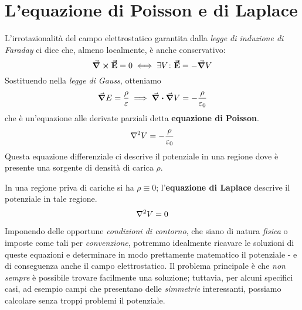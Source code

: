 \section{L'equazione di Poisson e di Laplace}\label{EqPoissonSezione}
L'irrotazionalità del campo elettrostatico garantita dalla \textit{legge di induzione di Faraday} ci dice che, almeno localmente, è anche conservativo:
\begin{equation*}
	\curl{\vb*{\va{E}}}=0\iff \exists V\colon \vb*{\va{E}}=-\grad{V}
\end{equation*}
Sostituendo nella \textit{legge di Gauss}, otteniamo
\begin{equation*}
	\grad{E}=\frac{\rho}{\varepsilon}\implies\div{\grad{V}}=-\frac{\rho}{\varepsilon_0}
\end{equation*}
che è un'equazione alle derivate parziali detta \textbf{equazione di Poisson}.
\begin{equation}
	\laplacian{V}=-\frac{\rho}{\epsilon_0}
\end{equation}
Questa equazione differenziale ci descrive il potenziale in una regione dove è presente una sorgente di densità di carica $\rho$.

In una regione priva di cariche si ha $\rho\equiv0$; l'\textbf{equazione di Laplace} descrive il potenziale in tale regione.
\begin{equation}
	\laplacian{V}=0
\end{equation}

Imponendo delle opportune \textit{condizioni di contorno}, che siano di natura \textit{fisica} o imposte come tali per \textit{convenzione}, potremmo idealmente ricavare le soluzioni di queste equazioni e determinare in modo prettamente matematico il potenziale - e di conseguenza anche il campo elettrostatico. Il problema principale è che \textit{non sempre} è possibile trovare facilmente una soluzione; tuttavia, per alcuni specifici casi, ad esempio campi che presentano delle \textit{simmetrie} interessanti, possiamo calcolare senza troppi problemi il potenziale.
